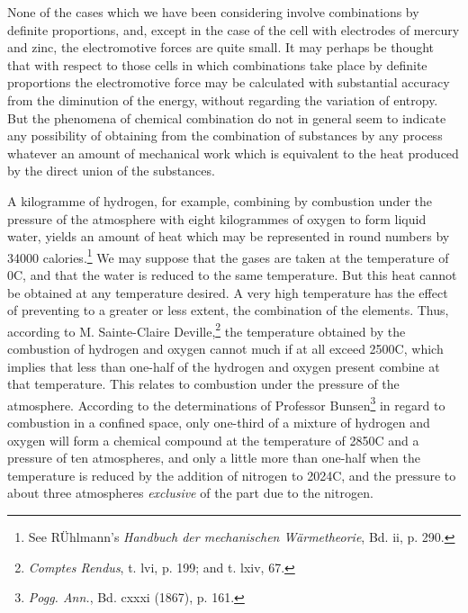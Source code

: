 \documentclass[12pt]{article}
\begin{document}
None of the cases which we have been considering involve combinations by definite proportions, and, except in the case of the cell with electrodes of mercury and zinc, the electromotive forces are quite small. It may perhaps be thought that with respect to those cells in which combinations take place by definite proportions the electromotive force may be calculated with substantial accuracy from the diminution of the energy, without regarding the variation of entropy. But the phenomena of chemical combination do not in general seem to indicate any possibility of obtaining from the combination of substances by any process whatever an amount of mechanical work which is equivalent to the heat produced by the direct union of the substances.

A kilogramme of hydrogen, for example, combining by combustion under the pressure of the atmosphere with eight kilogrammes of oxygen to form liquid water, yields an amount of heat which may be represented in round numbers by 34000 calories.\footnote{See R\"{U}hlmann's \textit{Handbuch der mechanischen W\"{a}rmetheorie}, Bd. ii, p. 290.} We may suppose that the gases are taken at the temperature of 0\degree C, and that the water is reduced to the same temperature. But this heat cannot be obtained at any temperature desired. A very high temperature has the effect of preventing to a greater or less extent, the combination of the elements. Thus, according to M. Sainte-Claire Deville,\footnote{\textit{Comptes Rendus}, t. lvi, p. 199; and t. lxiv, 67.} the temperature obtained by the combustion of hydrogen and oxygen cannot much if at all exceed 2500\degree C, which implies that less than one-half of the hydrogen and oxygen present combine at that temperature. This relates to combustion under the pressure of the atmosphere. According to the determinations of Professor Bunsen\footnote{\textit{Pogg. Ann.}, Bd. cxxxi (1867), p. 161.} in regard to combustion in a confined space, only one-third of a mixture of hydrogen and oxygen will form a chemical compound at the temperature of 2850\degree C and a pressure of ten atmospheres, and only a little more than one-half when the temperature is reduced by the addition of nitrogen to 2024\degree C, and the pressure to about three atmospheres \textit{exclusive} of the part due to the nitrogen.
\end{document}
